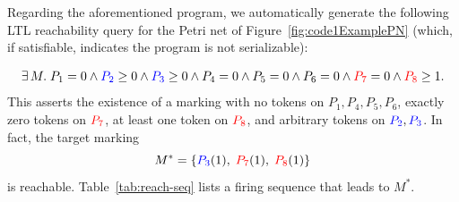 Regarding the aforementioned program, we automatically generate the following LTL reachability query for the Petri net of Figure~\ref{fig:code1ExamplePN} (which, if satisfiable, indicates the program is not serializable):

\[
\exists\,M.\; 
P_1 = 0 \wedge 
\textcolor{blue}{P_2} \ge 0 \wedge \textcolor{blue}{P_3} \ge 0  \wedge P_4 = 0
\wedge P_5 = 0 \wedge P_6 = 0 \wedge \textcolor{red}{P_7} = 0 \wedge \textcolor{red}{P_8} \ge 1.
\]
This asserts the existence of a marking with no tokens on $P_1,P_4,P_5,P_6$, exactly zero tokens on $\textcolor{red}{P_7}$, at least one token on $\textcolor{red}{P_8}$, and arbitrary tokens on $\textcolor{blue}{P_2},\textcolor{blue}{P_3}$.  In fact, the target marking
\[
M^* = \{\textcolor{blue}{P_3}(1),\;\textcolor{red}{P_7}(1),\;\textcolor{red}{P_8}(1)\}
\]
is reachable.  Table~\ref{tab:reach-seq} lists a firing sequence that leads to $M^*$.





